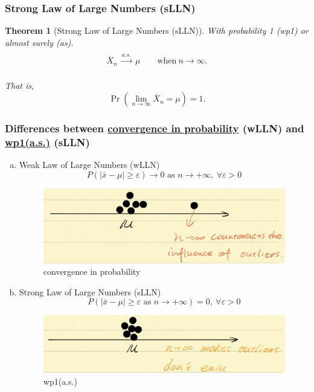 \documentclass[11pt,a4paper]{article}
\newtheorem{theorem}{Theorem}
\begin{document}
\subsubsection{Strong Law of Large Numbers (sLLN)}
\begin{theorem}[Strong Law of Large Numbers (sLLN)]
    \quad

    With probability 1 (wp1) or almost surely (as).
    $${\displaystyle {\begin{matrix}{}\\{\overline {X}}_{n}\ {\xrightarrow {a.s.}}\ \mu \qquad {\text{when}}\ n\to \infty .\\{}\end{matrix}}}$$

    That is,
    $$\Pr \!\left(\lim _{n\to \infty }{\overline {X}}_{n}=\mu \right)=1.$$
\end{theorem}

\subsubsection{Differences between \underline{convergence in probability} (wLLN) and \underline{wp1(a.s.)} (sLLN)}
\begin{enumerate}[a)]
    \item Weak Law of Large Numbers (wLLN)
    $$P(|\bar{x}-\mu|\geq\varepsilon)\rightarrow 0\text{ as }n \rightarrow	+\infty,\ \forall \varepsilon>0$$
    \begin{center}\begin{figure}[htbp]
        \centering
        \includegraphics[scale=0.3]{wLLN.png}
        \caption{convergence in probability}
        \label{}
    \end{figure}\end{center}
    \item Strong Law of Large Numbers (sLLN)
    $$P(|\bar{x}-\mu|\geq\varepsilon\text{ as }n \rightarrow+\infty)=0,\ \forall \varepsilon>0$$
    \begin{center}\begin{figure}[htbp]
        \centering
        \includegraphics[scale=0.3]{sLLN.png}
        \caption{wp1(a.s.)}
        \label{}
    \end{figure}\end{center}
\end{enumerate}
\end{document}
